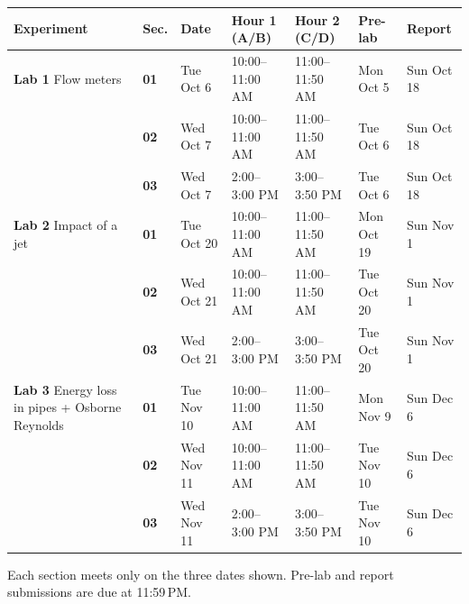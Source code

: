 {\setlength{\tabcolsep}{2.5pt}\begin{tabularx}{\textwidth}{@{}X C{0.045\textwidth} L{0.105\textwidth} C{0.115\textwidth} C{0.115\textwidth} L{0.095\textwidth} L{0.095\textwidth}@{}}
\toprule
Experiment & Sec. & Date & Hour 1 (A/B) & Hour 2 (C/D) & Pre-lab & Report \\
\midrule
\textbf{Lab 1} \newline Flow meters & \textbf{01} & Tue Oct 6 & 10:00--11:00 AM & 11:00--11:50 AM & Mon Oct 5 & Sun Oct 18 \\
 & \textbf{02} & Wed Oct 7 & 10:00--11:00 AM & 11:00--11:50 AM & Tue Oct 6 & Sun Oct 18 \\
 & \textbf{03} & Wed Oct 7 & 2:00--3:00 PM & 3:00--3:50 PM & Tue Oct 6 & Sun Oct 18 \\
\addlinespace[3pt]
\textbf{Lab 2} \newline Impact of a jet & \textbf{01} & Tue Oct 20 & 10:00--11:00 AM & 11:00--11:50 AM & Mon Oct 19 & Sun Nov 1 \\
 & \textbf{02} & Wed Oct 21 & 10:00--11:00 AM & 11:00--11:50 AM & Tue Oct 20 & Sun Nov 1 \\
 & \textbf{03} & Wed Oct 21 & 2:00--3:00 PM & 3:00--3:50 PM & Tue Oct 20 & Sun Nov 1 \\
\addlinespace[3pt]
\textbf{Lab 3} \newline Energy loss in pipes + Osborne Reynolds & \textbf{01} & Tue Nov 10 & 10:00--11:00 AM & 11:00--11:50 AM & Mon Nov 9 & Sun Dec 6 \\
 & \textbf{02} & Wed Nov 11 & 10:00--11:00 AM & 11:00--11:50 AM & Tue Nov 10 & Sun Dec 6 \\
 & \textbf{03} & Wed Nov 11 & 2:00--3:00 PM & 3:00--3:50 PM & Tue Nov 10 & Sun Dec 6 \\
\bottomrule
\end{tabularx}}
\par\vspace{0.15em}
{\footnotesize Each section meets only on the three dates shown. Pre-lab and report submissions are due at 11:59\,PM.}

